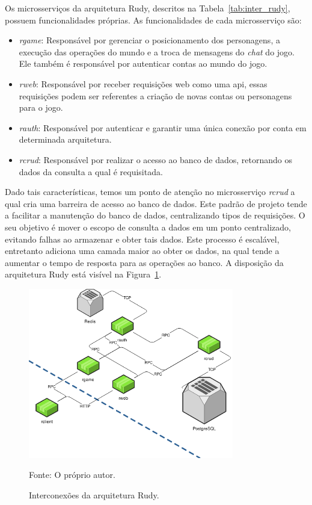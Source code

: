 Os microsserviços da arquitetura Rudy, descritos na Tabela~\ref{tab:inter_rudy}, possuem funcionalidades próprias.
%
As funcionalidades de cada microsserviço são:



\begin{itemize}
  \item \textit{rgame}: Responsável por gerenciar o posicionamento dos personagens, a execução das operações do mundo e a troca de mensagens do \textit{chat} do jogo. Ele também é responsável por autenticar contas ao mundo do jogo.
  \item \textit{rweb}: Responsável por receber requisições web como uma \ac{api}, essas requisições podem ser referentes a criação de novas contas ou personagens para o jogo.
  \item \textit{rauth}: Responsável por autenticar e garantir uma única conexão por conta em determinada arquitetura.
  \item \textit{rcrud}: Responsável por realizar o acesso ao banco de dados, retornando os dados da consulta a qual é requisitada.
\end{itemize}



Dado tais características, temos um ponto de atenção no microsserviço \textit{rcrud} a qual cria uma barreira de acesso ao banco de dados.
%
Este padrão de projeto tende a facilitar a manutenção do banco de dados, centralizando tipos de requisições.
%
O seu objetivo é mover o escopo de consulta a dados em um ponto centralizado, evitando falhas ao armazenar e obter tais dados.
%
Este processo é escalável, entretanto adiciona uma camada maior ao obter os dados, na qual tende a aumentar o tempo de resposta para as operações ao banco.
%
A disposição da arquitetura Rudy está visível na Figura~\ref{fig:interconexao_rudy}.



\begin{figure}[htb!]
  \caption{Interconexões da arquitetura Rudy.}
  \label{fig:interconexao_rudy}
  \includegraphics[width=0.8\textwidth]{figuras/interconexoes/rudy.png}
  \centering

  Fonte: O próprio autor.
\end{figure}


